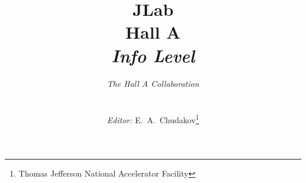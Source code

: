 \begin{titlepage}
\title{{\bf JLab \\  Hall A %
    
     \\[0.5cm]
    }{\normalsize {\sl Info Level \infolevel}}\\
}

\author{\centerline{{\it The Hall A Collaboration}}\\ 
    \centerline{\small {\it Editor:} E.~A.~Chudakov\thanks{Thomas Jefferson National Accelerator Facility}}
}
    
\setcounter{tocdepth}{3}
\end{titlepage} 
\maketitle 
 
